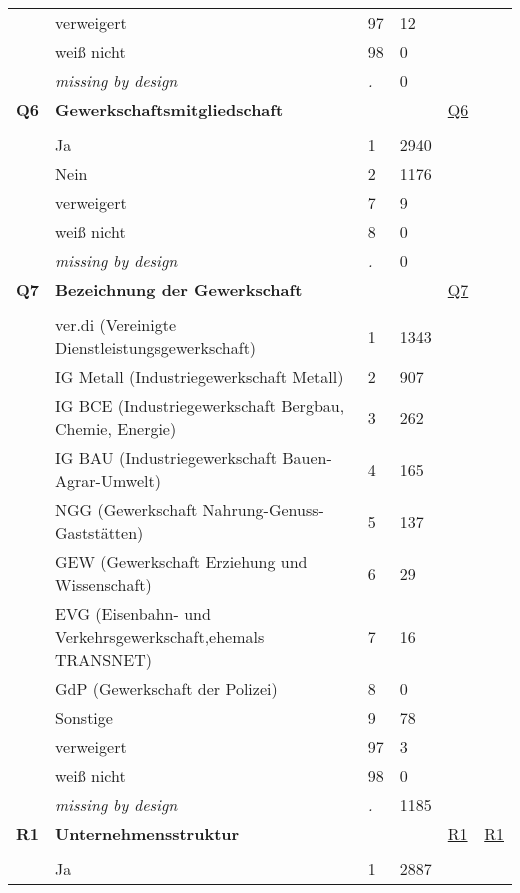 \begin{longtable}{| L{2.45cm} | L{6cm} | C{1.5cm} | R{1cm} | C{2.25cm} | C{2.25cm} |}
   & verweigert & 97 & 12 &  &  \\ 
   & weiß nicht & 98 & 0 &  &  \\ 
   & \textit{missing by design} & \textit{.} & 0 &  &  \\ 
   \midrule
\textbf{Q6}\label{var:Q6} & \textbf{Gewerkschaftsmitgliedschaft} &  &  & \hyperref[Q6]{Q6} & \hyperref[var:suf:]{} \\ 
   &  &  &  &  &  \\ 
   & Ja & 1 & 2940 &  &  \\ 
   & Nein & 2 & 1176 &  &  \\ 
   & verweigert & 7 & 9 &  &  \\ 
   & weiß nicht & 8 & 0 &  &  \\ 
   & \textit{missing by design} & \textit{.} & 0 &  &  \\ 
   \midrule
\textbf{Q7}\label{var:Q7} & \textbf{Bezeichnung der Gewerkschaft} &  &  & \hyperref[Q7]{Q7} & \hyperref[var:suf:]{} \\ 
   &  &  &  &  &  \\ 
   & ver.di (Vereinigte Dienstleistungsgewerkschaft) & 1 & 1343 &  &  \\ 
   & IG Metall (Industriegewerkschaft Metall) & 2 & 907 &  &  \\ 
   & IG BCE (Industriegewerkschaft Bergbau, Chemie, Energie) & 3 & 262 &  &  \\ 
   & IG BAU (Industriegewerkschaft Bauen-Agrar-Umwelt) & 4 & 165 &  &  \\ 
   & NGG (Gewerkschaft Nahrung-Genuss-Gaststätten) & 5 & 137 &  &  \\ 
   & GEW (Gewerkschaft Erziehung und Wissenschaft) & 6 & 29 &  &  \\ 
   & EVG (Eisenbahn- und Verkehrsgewerkschaft,ehemals TRANSNET) & 7 & 16 &  &  \\ 
   & GdP (Gewerkschaft der Polizei) & 8 & 0 &  &  \\ 
   & Sonstige & 9 & 78 &  &  \\ 
   & verweigert & 97 & 3 &  &  \\ 
   & weiß nicht & 98 & 0 &  &  \\ 
   & \textit{missing by design} & \textit{.} & 1185 &  &  \\ 
   \midrule
\textbf{R1}\label{var:R1} & \textbf{Unternehmensstruktur} &  &  & \hyperref[R1]{R1} & \hyperref[var:suf:R1]{R1} \\ 
   &  &  &  &  &  \\ 
   & Ja & 1 & 2887 &  &  \\ 

\end{longtable}
